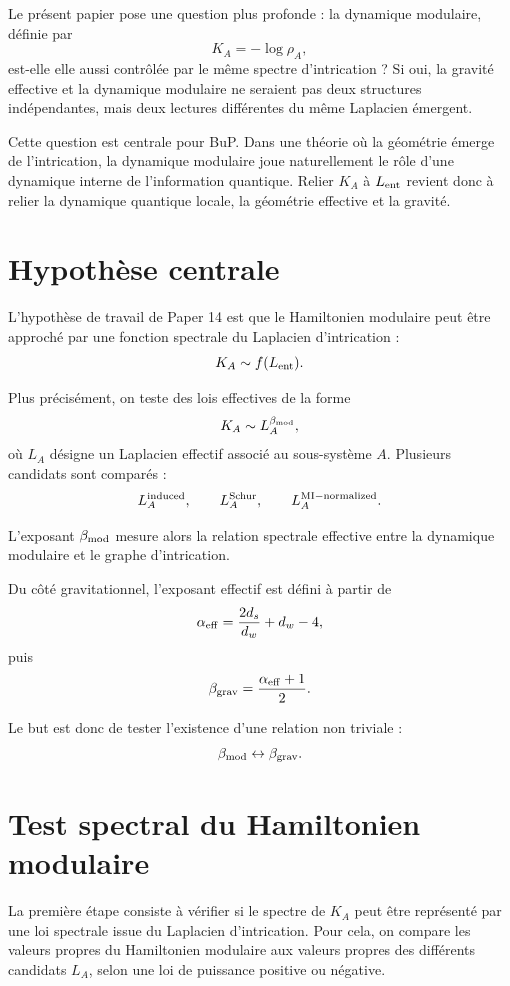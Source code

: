 \documentclass[11pt,a4paper]{article}
\begin{document}
Le présent papier pose une question plus profonde : la dynamique modulaire,
définie par
\[
K_A=-\log\rho_A,
\]
est-elle elle aussi contrôlée par le même spectre d'intrication ? Si oui, la
gravité effective et la dynamique modulaire ne seraient pas deux structures
indépendantes, mais deux lectures différentes du même Laplacien émergent.

Cette question est centrale pour BuP. Dans une théorie où la géométrie émerge
de l'intrication, la dynamique modulaire joue naturellement le rôle d'une
dynamique interne de l'information quantique. Relier \(K_A\) à
\(L_{\rm ent}\) revient donc à relier la dynamique quantique locale, la
géométrie effective et la gravité.

\section{Hypothèse centrale}

L'hypothèse de travail de Paper 14 est que le Hamiltonien modulaire peut être
approché par une fonction spectrale du Laplacien d'intrication :
\[
K_A \sim f(L_{\rm ent}).
\]

Plus précisément, on teste des lois effectives de la forme
\[
K_A \sim L_A^{\beta_{\rm mod}},
\]
où \(L_A\) désigne un Laplacien effectif associé au sous-système \(A\).
Plusieurs candidats sont comparés :
\[
L_A^{\rm induced},
\qquad
L_A^{\rm Schur},
\qquad
L_A^{\rm MI-normalized}.
\]

L'exposant \(\beta_{\rm mod}\) mesure alors la relation spectrale effective
entre la dynamique modulaire et le graphe d'intrication.

Du côté gravitationnel, l'exposant effectif est défini à partir de
\[
\alpha_{\rm eff}
=
\frac{2d_s}{d_w}+d_w-4,
\]
puis
\[
\beta_{\rm grav}
=
\frac{\alpha_{\rm eff}+1}{2}.
\]

Le but est donc de tester l'existence d'une relation non triviale :
\[
\beta_{\rm mod}
\leftrightarrow
\beta_{\rm grav}.
\]

\section{Test spectral du Hamiltonien modulaire}

La première étape consiste à vérifier si le spectre de \(K_A\) peut être
représenté par une loi spectrale issue du Laplacien d'intrication. Pour cela,
on compare les valeurs propres du Hamiltonien modulaire aux valeurs propres
des différents candidats \(L_A\), selon une loi de puissance positive ou
négative.
\end{document}
